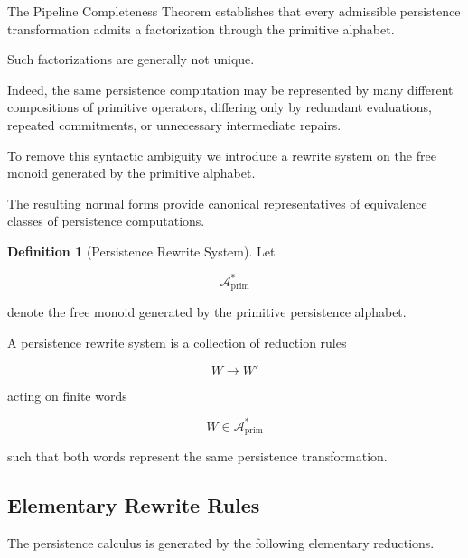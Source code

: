 \documentclass[11pt]{book}
\numberwithin{equation}{chapter}
\theoremstyle{definition}
\newtheorem{definition}{Definition}[chapter]
\theoremstyle{plain}
\begin{document}
The Pipeline Completeness Theorem establishes that every admissible
persistence transformation admits a factorization through the primitive
alphabet.

Such factorizations are generally not unique.

Indeed, the same persistence computation may be represented by many
different compositions of primitive operators, differing only by
redundant evaluations, repeated commitments, or unnecessary intermediate
repairs.

To remove this syntactic ambiguity we introduce a rewrite system on the
free monoid generated by the primitive alphabet.

The resulting normal forms provide canonical representatives of
equivalence classes of persistence computations.

\begin{definition}[Persistence Rewrite System]

Let

\[
\mathcal A_{\mathrm{prim}}^*
\]

denote the free monoid generated by the primitive persistence alphabet.

A persistence rewrite system is a collection of reduction rules

\[
W
\longrightarrow
W'
\]

acting on finite words

\[
W\in\mathcal A_{\mathrm{prim}}^*
\]

such that both words represent the same persistence transformation.

\end{definition}

\subsection{Elementary Rewrite Rules}

The persistence calculus is generated by the following elementary
reductions.
\end{document}
